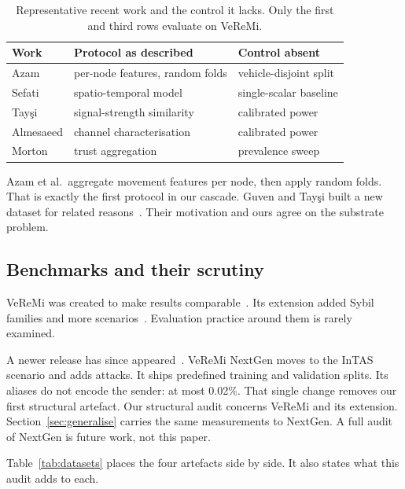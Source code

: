 \documentclass[conference]{IEEEtran}
\begin{document}
\begin{table}[t]
\caption{Representative recent work and the control it lacks.
Only the first and third rows evaluate on VeReMi.}
\label{tab:touch}
\centering
\footnotesize
\begin{tabular}{@{}>{\raggedright\arraybackslash}p{1.75cm}>{\raggedright\arraybackslash}p{2.6cm}>{\raggedright\arraybackslash}p{2.55cm}@{}}
\toprule
Work & Protocol as described & Control absent \\
\midrule
Azam \cite{azam2022}      & per-node features, random folds & vehicle-disjoint split \\
Sefati \cite{sefati2025}  & spatio-temporal model & single-scalar baseline \\
Tay\c{s}i \cite{taysi2025}& signal-strength similarity      & calibrated power \\
Almesaeed \cite{almesaeed2025} & channel characterisation   & calibrated power \\
Morton \cite{morton2024}  & trust aggregation               & prevalence sweep \\
\bottomrule
\end{tabular}
\end{table}

Azam et al.\ aggregate movement features per node, then apply random folds.
That is exactly the first protocol in our cascade.
Guven and Tay\c{s}i built a new dataset for related reasons~\cite{guven2024}.
Their motivation and ours agree on the substrate problem.

\subsection{Benchmarks and their scrutiny}

VeReMi was created to make results comparable~\cite{heijden2018}.
Its extension added Sybil families and more scenarios~\cite{kamel2020}.
Evaluation practice around them is rarely examined.

A newer release has since appeared~\cite{nextgen2026}.
VeReMi NextGen moves to the InTAS scenario and adds attacks.
It ships predefined training and validation splits.
Its aliases do not encode the sender: at most 0.02\%.
That single change removes our first structural artefact.
Our structural audit concerns VeReMi and its extension.
Section~\ref{sec:generalise} carries the same measurements to NextGen.
A full audit of NextGen is future work, not this paper.

Table~\ref{tab:datasets} places the four artefacts side by side.
It also states what this audit adds to each.
\end{document}
